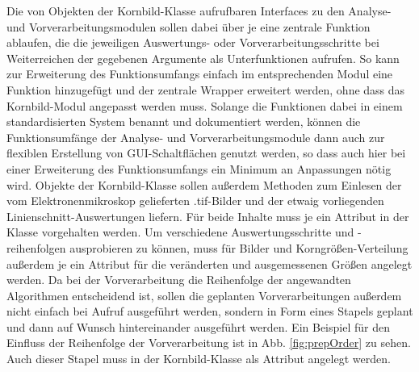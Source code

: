 \documentclass[
  12pt,
  openany]{book}
\begin{document}
Die von Objekten der Kornbild-Klasse aufrufbaren Interfaces zu den Analyse- und Vorverarbeitungsmodulen sollen dabei über je eine zentrale Funktion ablaufen, die die jeweiligen Auswertungs- oder Vorverarbeitungsschritte bei Weiterreichen der gegebenen Argumente als Unterfunktionen aufrufen. So kann zur Erweiterung des Funktionsumfangs einfach im entsprechenden Modul eine Funktion hinzugefügt und der zentrale Wrapper erweitert werden, ohne dass das Kornbild-Modul angepasst werden muss. Solange die Funktionen dabei in einem standardisierten System benannt und dokumentiert werden, können die Funktionsumfänge der Analyse- und Vorverarbeitungsmodule dann auch zur flexiblen Erstellung von GUI-Schaltflächen genutzt werden, so dass auch hier bei einer Erweiterung des Funktionsumfangs ein Minimum an Anpassungen nötig wird.\newline
Objekte der Kornbild-Klasse sollen außerdem Methoden zum Einlesen der vom Elektronenmikroskop gelieferten .tif-Bilder und der etwaig vorliegenden Linienschnitt-Auswertungen liefern. Für beide Inhalte muss je ein Attribut in der Klasse vorgehalten werden. Um verschiedene Auswertungsschritte und -reihenfolgen ausprobieren zu können, muss für Bilder und Korngrößen-Verteilung außerdem je ein Attribut für die veränderten und ausgemessenen Größen angelegt werden.\newline
Da bei der Vorverarbeitung die Reihenfolge der angewandten Algorithmen entscheidend ist, sollen die geplanten Vorverarbeitungen außerdem nicht einfach bei Aufruf ausgeführt werden, sondern in Form eines Stapels geplant und dann auf Wunsch hintereinander ausgeführt werden. Ein Beispiel für den Einfluss der Reihenfolge der Vorverarbeitung ist in Abb. \ref{fig:prepOrder} zu sehen. Auch dieser Stapel muss in der Kornbild-Klasse als Attribut angelegt werden.
\end{document}

